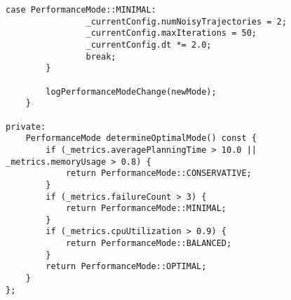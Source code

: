 \begin{lstlisting}[caption={Adaptive Performance Management}, label={lst:performance_management}]
            case PerformanceMode::MINIMAL:
                _currentConfig.numNoisyTrajectories = 2;
                _currentConfig.maxIterations = 50;
                _currentConfig.dt *= 2.0;
                break;
        }
        
        logPerformanceModeChange(newMode);
    }
    
private:
    PerformanceMode determineOptimalMode() const {
        if (_metrics.averagePlanningTime > 10.0 || _metrics.memoryUsage > 0.8) {
            return PerformanceMode::CONSERVATIVE;
        }
        if (_metrics.failureCount > 3) {
            return PerformanceMode::MINIMAL;
        }
        if (_metrics.cpuUtilization > 0.9) {
            return PerformanceMode::BALANCED;
        }
        return PerformanceMode::OPTIMAL;
    }
};
\end{lstlisting}
